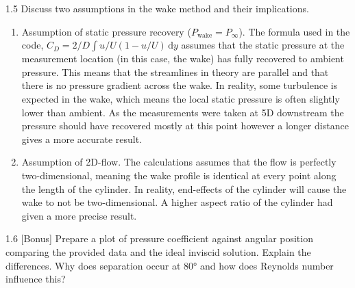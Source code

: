   \begin{problem}{1.5}
    Discuss two assumptions in the wake method and their implications.
  \end{problem}

  \begin{derivation}
    \begin{enumerate}
      \item Assumption of static pressure recovery ($P_{\text{wake}} = P_{\infty}$).
        The formula used in the code, $C_D = 2 / D \int  u / U (1 - u / U) \, \mathrm{d}y$ assumes that the static pressure at the measurement location (in this case, the wake) has fully recovered to ambient pressure.
        This means that the streamlines in theory are parallel and that there is no pressure gradient across the wake.
        In reality, some turbulence is expected in the wake, which means the local static pressure is often slightly lower than ambient.
        As the measurements were taken at 5D downstream the pressure should have recovered mostly at this point however a longer distance gives a more accurate result.
      \item Assumption of 2D-flow.
        The calculations assumes that the flow is perfectly two-dimensional, meaning the wake profile is identical at every point along the length of the cylinder.
        In reality, end-effects of the cylinder will cause the wake to not be two-dimensional.
        A higher aspect ratio of the cylinder had given a more precise result.
    \end{enumerate}
  \end{derivation}

  \newpage

  \begin{problem}{1.6}
    [Bonus] Prepare a plot of pressure coefficient against angular position comparing the provided data and the ideal inviscid solution. Explain the differences. Why does separation occur at \ang{80} and how does Reynolds number influence this?
  \end{problem}


